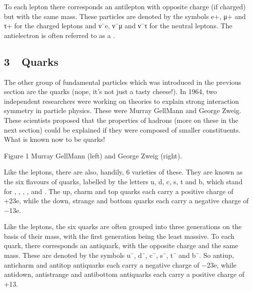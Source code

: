 \documentclass[letterpaper,10pt,english]{sphinxmanual}
\let\sphinxpxdimen\pdfpxdimen\else\newdimen\sphinxpxdimen
\begin{document}
To each lepton there corresponds an antilepton with opposite charge (if charged) but with the same mass. These  particles are denoted by the symbols e+, μ+ and τ+ for the charged leptons and ν¯e⁢, ν¯μ and ν¯τ for the neutral leptons. The antielectron is often referred to as a .


\subsection{3  Quarks}
\label{\detokenize{content/session_00/Part_00_03:3_xa0_xa0Quarks}}\label{\detokenize{content/session_00/Part_00_03::doc}}
The other group of fundamental particles which was introduced in the previous section are the quarks (nope, it’s not just a tasty cheese!). In 1964, two independent researchers were working on theories to explain strong interaction symmetry in particle physics. These were Murray Gell\sphinxhyphen{}Mann and George Zweig. These scientists proposed that the properties of hadrons (more on these in the next section) could be explained if they were composed of smaller constituents. What is known now to be quarks!

\sphinxincludegraphics[width=512\sphinxpxdimen,height=351\sphinxpxdimen]{{sm123_1_figure1_murray_george.tif}.jpg}

Figure 1 Murray Gell\sphinxhyphen{}Mann (left) and George Zweig (right).

Like the leptons, there are also, handily, 6 varieties of these. They are known as the six flavours of quarks, labelled by the letters u, d, c, s, t and b, which stand for , , , ,  and . The up, charm and top quarks each carry a positive charge of +23e, while the down, strange and bottom quarks each carry a negative charge of −13e.

Like the leptons, the six quarks are often grouped into three generations on the basis of their mass, with the first generation being the least massive. To each quark, there corresponds an antiquark, with the opposite charge and the same mass. These are denoted by the symbols u¯, d¯, c¯, s¯, t¯ and b¯. So anti\sphinxhyphen{}up, anti\sphinxhyphen{}charm and anti\sphinxhyphen{}top antiquarks each carry a negative charge of −23e, while anti\sphinxhyphen{}down, anti\sphinxhyphen{}strange and anti\sphinxhyphen{}bottom antiquarks each carry a positive charge of +13.
\end{document}
